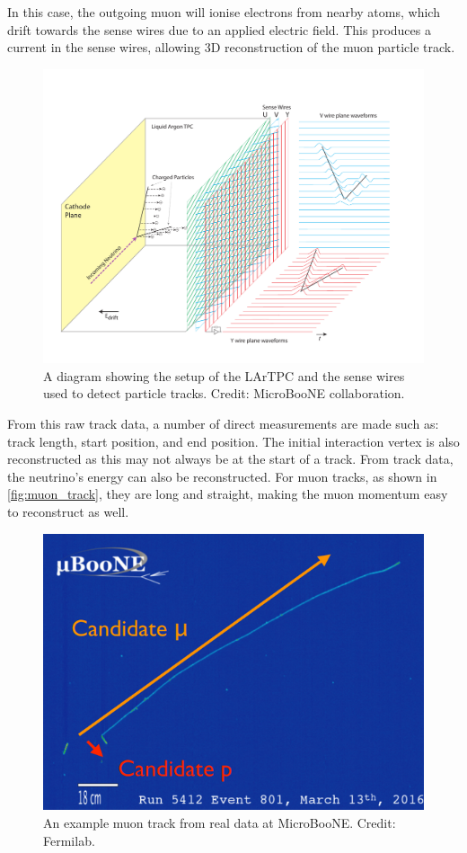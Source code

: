 \documentclass[reprint,
    nofootinbib,
    amsmath,amssymb,
    aps,
    10pt,
    nolongbibliography,
]{revtex4-2}
\begin{document}
In this case, the outgoing muon will ionise electrons
from nearby atoms, which drift towards the sense wires due to an applied electric field. This
produces a current in the sense wires, allowing 3D reconstruction of the muon particle track.

\begin{figure}[H]
    \centering
    \includegraphics[width=\linewidth]{img/LArTPC_Concept.pdf}
    \caption{A diagram showing the setup of the LArTPC and the sense
    wires used to detect particle tracks. Credit: MicroBooNE collaboration\cite{microboone_tpc}.}
\end{figure}

From this raw track data, a number of direct measurements are made such as: track length,
start position, and end position. The initial interaction vertex is also reconstructed as this may
not always be at the start of a track\cite{interaction_vertex}. From track data, the neutrino's
energy can also be reconstructed. For muon tracks, as shown in \autoref{fig:muon_track}, they are
long and straight, making the muon momentum easy to reconstruct as well.

\begin{figure}[H]
    \centering
    \includegraphics[width=0.75\linewidth]{img/uboone_muon_event.png}
    \caption{An example muon track from real data at MicroBooNE. Credit: Fermilab.}
    \label{fig:muon_track}
\end{figure}
\end{document}
